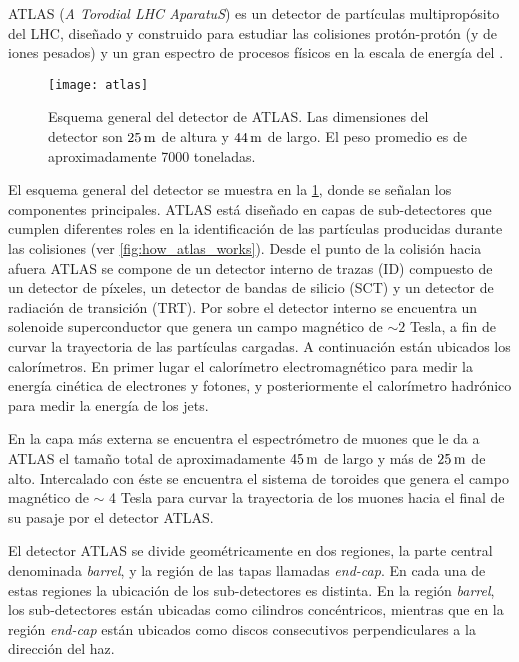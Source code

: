 ATLAS (\emph{A Torodial LHC AparatuS}) es un detector de partículas
multipropósito del LHC, diseñado y construido para estudiar las colisiones
protón-protón (y de iones pesados) y un gran espectro de procesos físicos en la
escala de energía del \tev.

\begin{figure}[!htb]
  \centering

  \texttt{[image: atlas]}
  \caption{Esquema general del detector de ATLAS. Las dimensiones del detector
    son $\unit[25]{m}$ de altura y $\unit[44]{m}$ de largo. El peso promedio es
    de aproximadamente 7000 toneladas.}
  \label{fig:atlas}

\end{figure}

El esquema general del detector se muestra en la \cref{fig:atlas}, donde se
señalan los componentes principales. ATLAS está diseñado en capas de
sub-detectores que cumplen diferentes roles en la identificación de las
partículas producidas durante las colisiones (ver \cref{fig:how_atlas_works}).
Desde el punto de la colisión
hacia afuera ATLAS se compone de un detector interno de trazas (ID) compuesto de
un detector de píxeles, un detector de bandas de silicio (SCT) y un detector de
radiación de transición (TRT).
Por sobre el detector interno se encuentra un
solenoide superconductor que genera un campo magnético de $\sim 2$ Tesla, a fin
de curvar la trayectoria de las partículas cargadas.
A continuación están ubicados los calorímetros. En primer lugar el calorímetro
electromagnético para medir la energía cinética de electrones y fotones, y
posteriormente el calorímetro hadrónico para medir la energía de los jets.

En la capa más externa se encuentra el espectrómetro de muones que le da a ATLAS
el tamaño total de aproximadamente $\unit[45]{m}$ de largo y más de
$\unit[25]{m}$ de alto. Intercalado con éste se encuentra el sistema de toroides
que genera el campo magnético de $\sim$ 4 Tesla para curvar la trayectoria de
los muones hacia el final de su pasaje por el detector ATLAS.

El detector ATLAS se divide geométricamente en dos regiones, la parte central
denominada \emph{barrel}, y la región de las tapas llamadas \emph{end-cap}.
En cada una de estas regiones la ubicación de los
sub-detectores es distinta. En la región \emph{barrel}, los sub-detectores están
ubicadas como cilindros concéntricos, mientras que en la región \emph{end-cap}
están ubicados como discos consecutivos perpendiculares a la dirección del haz.


